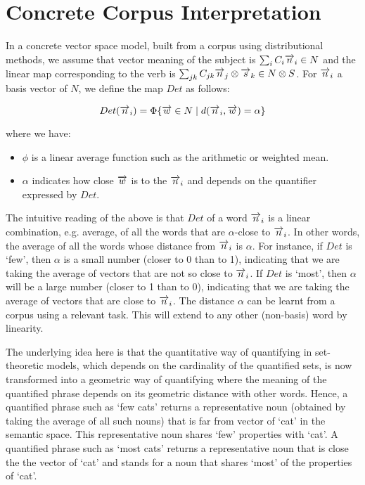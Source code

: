 \section{Concrete Corpus  Interpretation}


In a concrete vector space model, built from a corpus using distributional methods, we assume that  vector meaning of the subject is $\sum_i C_i \overrightarrow{n}_i \in N$ and the linear map corresponding to the verb is $\sum_{jk} C_{jk} \overrightarrow{n}_j \otimes \overrightarrow{s}_k \in N \otimes S$.  For $\overrightarrow{n}_i$ a basis vector of $N$, we define  the map $Det$  as follows:

\begin{equation}\label{eqDet}
Det(\overrightarrow{n}_i) = \Phi \{\overrightarrow{w} \in N \mid d(\overrightarrow{n}_i, \overrightarrow{w}) = \alpha\}
\end{equation}

\noindent
where we have:
\begin{itemize}
\item  $\phi$ is a linear average function such as the   arithmetic or weighted mean. 
\item  $\alpha$ indicates how close $\overrightarrow{w}$ is to the $\overrightarrow{n}_i$ and depends on the quantifier expressed by $Det$. 
\end{itemize}

\noindent
The intuitive reading of the above is that $Det$ of a word $\overrightarrow{n}_i$ is a linear combination, e.g.  average,  of all the words that are $\alpha$-close to $\overrightarrow{n}_i$. In other words, the average of all the words  whose distance from $\overrightarrow{n}_i$ is $\alpha$.  For instance, if $Det$ is `few', then $\alpha$ is a small number (closer to 0 than to 1), indicating that we are taking the average of vectors that are not so close to $\overrightarrow{n}_i$. If $Det$ is `most', then $\alpha$ will be a large number (closer to 1 than to 0), indicating that we are taking the average of vectors that are close to $\overrightarrow{n}_i$. The distance $\alpha$ can be learnt from a corpus using a relevant task. This will extend to any other (non-basis) word by linearity.  

The underlying idea here is that the quantitative way of quantifying in set-theoretic models, which depends on the cardinality of the quantified sets, is now transformed into a geometric way of quantifying where the meaning of the quantified phrase depends on its geometric distance with other words. Hence, a quantified phrase such as `few cats' returns a representative noun (obtained by taking the average of all such nouns) that is far from vector of  `cat'  in the semantic space. This representative noun shares `few' properties with `cat'. A quantified phrase such as `most cats' returns a representative noun that is close the the vector of `cat' and stands for a noun that shares `most' of the properties of `cat'. 


